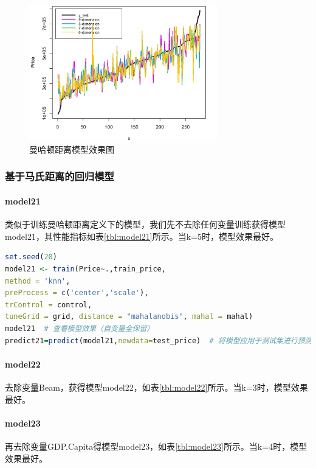\documentclass[a4paper,12pt,onecolumn,oneside]{article}
\begin{document}
	\begin{figure}[h]
		\centering
		\includegraphics[width=0.73\textwidth]{res/manhattan.png}
		\caption{曼哈顿距离模型效果图}
		\label{fig:manhattan}
	\end{figure}
	\clearpage
	\subsubsection{基于马氏距离的回归模型}
	\paragraph{model21}类似于训练曼哈顿距离定义下的模型，我们先不去除任何变量训练获得模型model21，其性能指标如表\ref{tbl:model21}所示。当k=5时，模型效果最好。
\begin{lstlisting}[language=R, caption={knn回归，马氏距离}, label={lst:4}, belowcaptionskip=0.5\baselineskip]
set.seed(20)
model21 <- train(Price~.,train_price,
method = 'knn',
preProcess = c('center','scale'),
trControl = control,
tuneGrid = grid, distance = "mahalanobis", mahal = mahal)
model21  # 查看模型效果（自变量全保留）
predict21=predict(model21,newdata=test_price)  # 将模型应用于测试集进行预测
\end{lstlisting}
	\paragraph{model22}去除变量Beam，获得模型model22，如表\ref{tbl:model22}所示。当k=3时，模型效果最好。
	\paragraph{model23}再去除变量GDP.Capita得模型model23，如表\ref{tbl:model23}所示。当k=4时，模型效果最好。
\end{document}
